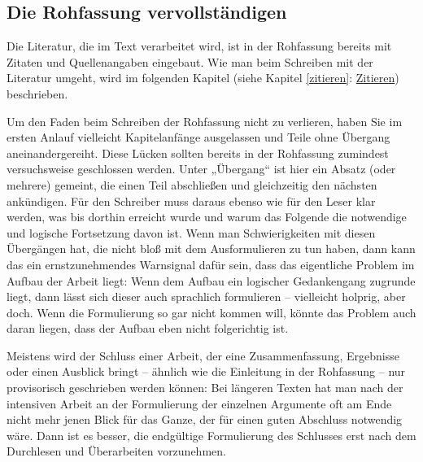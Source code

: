 \documentclass[]{book}
\theoremstyle{definition}
\theoremstyle{definition}
\theoremstyle{definition}
\theoremstyle{remark}
\begin{document}
\subsection{Die Rohfassung
vervollständigen}\label{die-rohfassung-vervollstandigen}

Die Literatur, die im Text verarbeitet wird, ist in der Rohfassung
bereits mit Zitaten und Quellenangaben eingebaut. Wie man beim Schreiben
mit der Literatur umgeht, wird im folgenden Kapitel (siehe Kapitel
\ref{zitieren}: \protect\hyperlink{zitieren}{Zitieren}) beschrieben.

Um den Faden beim Schreiben der Rohfassung nicht zu verlieren, haben Sie
im ersten Anlauf vielleicht Kapitelanfänge ausgelassen und Teile ohne
Übergang aneinandergereiht. Diese Lücken sollten bereits in der
Rohfassung zumindest versuchsweise geschlossen werden. Unter „Übergang``
ist hier ein Absatz (oder mehrere) gemeint, die einen Teil abschließen
und gleichzeitig den nächsten ankündigen. Für den Schreiber muss daraus
ebenso wie für den Leser klar werden, was bis dorthin erreicht wurde und
warum das Folgende die notwendige und logische Fortsetzung davon ist.
Wenn man Schwierigkeiten mit diesen Übergängen hat, die nicht bloß mit
dem Ausformulieren zu tun haben, dann kann das ein ernstzunehmendes
Warnsignal dafür sein, dass das eigentliche Problem im Aufbau der Arbeit
liegt: Wenn dem Aufbau ein logischer Gedankengang zugrunde liegt, dann
lässt sich dieser auch sprachlich formulieren -- vielleicht holprig,
aber doch. Wenn die Formulierung so gar nicht kommen will, könnte das
Problem auch daran liegen, dass der Aufbau eben nicht folgerichtig ist.

Meistens wird der Schluss einer Arbeit, der eine Zusammenfassung,
Ergebnisse oder einen Ausblick bringt -- ähnlich wie die Einleitung in
der Rohfassung -- nur provisorisch geschrieben werden können: Bei
längeren Texten hat man nach der intensiven Arbeit an der Formulierung
der einzelnen Argumente oft am Ende nicht mehr jenen Blick für das
Ganze, der für einen guten Abschluss notwendig wäre. Dann ist es besser,
die endgültige Formulierung des Schlusses erst nach dem Durchlesen und
Überarbeiten vorzunehmen.
\end{document}
